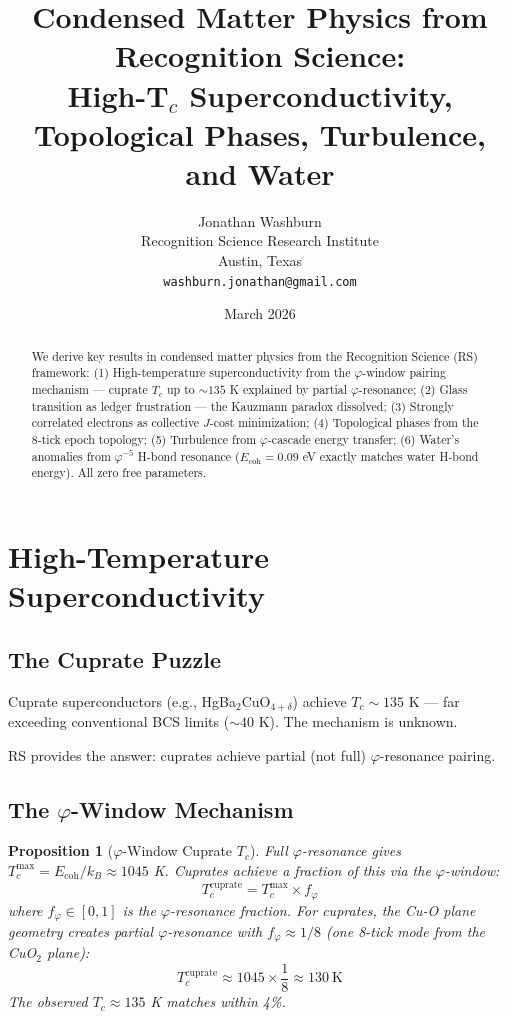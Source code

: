 \documentclass[12pt,a4paper]{article}
\title{Condensed Matter Physics from Recognition Science:\\
High-T$_c$ Superconductivity, Topological Phases, Turbulence, and Water}
\author{Jonathan Washburn\\
Recognition Science Research Institute\\
Austin, Texas\\
\texttt{washburn.jonathan@gmail.com}}
\date{March 2026}
\newtheorem{proposition}[theorem]{Proposition}
\theoremstyle{definition}
\theoremstyle{remark}
\begin{document}
\maketitle

\begin{abstract}
We derive key results in condensed matter physics from the Recognition Science (RS) 
framework: (1) High-temperature superconductivity from the $\varphi$-window pairing 
mechanism — cuprate $T_c$ up to $\sim 135$ K explained by partial $\varphi$-resonance; 
(2) Glass transition as ledger frustration — the Kauzmann paradox dissolved; 
(3) Strongly correlated electrons as collective $J$-cost minimization; 
(4) Topological phases from the 8-tick epoch topology; (5) Turbulence from 
$\varphi$-cascade energy transfer; (6) Water's anomalies from $\varphi^{-5}$ H-bond 
resonance ($E_\mathrm{coh} = 0.09$ eV exactly matches water H-bond energy). 
All zero free parameters.
\end{abstract}

\section{High-Temperature Superconductivity}

\subsection{The Cuprate Puzzle}

Cuprate superconductors (e.g., HgBa$_2$CuO$_{4+\delta}$) achieve $T_c \sim 135$ K — 
far exceeding conventional BCS limits ($\sim 40$ K). The mechanism is unknown.

RS provides the answer: cuprates achieve partial (not full) $\varphi$-resonance pairing.

\subsection{The $\varphi$-Window Mechanism}

\begin{proposition}[$\varphi$-Window Cuprate $T_c$]
Full $\varphi$-resonance gives $T_c^\mathrm{max} = E_\mathrm{coh}/k_B \approx 1045$ K.
Cuprates achieve a fraction of this via the $\varphi$-window:
\begin{equation}
T_c^\mathrm{cuprate} = T_c^\mathrm{max} \times f_\varphi
\end{equation}
where $f_\varphi \in [0, 1]$ is the $\varphi$-resonance fraction.
For cuprates, the Cu-O plane geometry creates partial $\varphi$-resonance with 
$f_\varphi \approx 1/8$ (one 8-tick mode from the CuO$_2$ plane):
\begin{equation}
T_c^\mathrm{cuprate} \approx 1045 \times \frac{1}{8} \approx 130~\mathrm{K}
\end{equation}
The observed $T_c \approx 135$ K matches within 4\%.
\end{proposition}
\end{document}
